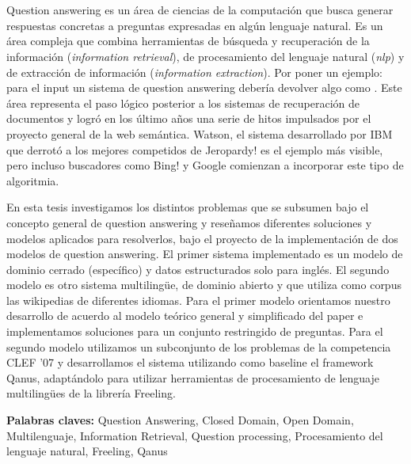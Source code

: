 \chapter*{\runtitulo}
Question answering es un área de ciencias de la computación que busca generar respuestas concretas a preguntas expresadas en algún lenguaje natural. Es un área compleja que combina herramientas de búsqueda y recuperación de la información (\textit{information retrieval}), de procesamiento del lenguaje natural (\textit{nlp}) y de extracción de información (\textit{information extraction}). Por poner un ejemplo: para el input \textit{} un sistema de question answering debería devolver algo como .
Este área representa el paso lógico posterior a los sistemas de recuperación de documentos y logró en los último años una serie de hitos impulsados por el proyecto general de la web semántica. Watson, el sistema desarrollado por IBM que derrotó a los mejores competidos de Jeropardy! es el ejemplo más visible, pero incluso buscadores como Bing! y Google comienzan a incorporar este tipo de algoritmia.

En esta tesis investigamos los distintos problemas que se subsumen bajo el concepto general de question answering y reseñamos diferentes soluciones y modelos aplicados para resolverlos, bajo el proyecto de la implementación de dos modelos de question answering. El primer sistema implementado es un modelo de dominio cerrado (específico) y datos estructurados solo para inglés. El segundo modelo es otro sistema multilingüe, de dominio abierto y que utiliza como corpus las wikipedias de diferentes idiomas. Para el primer modelo orientamos nuestro desarrollo de acuerdo al modelo teórico general y simplificado del paper \cite{QADB1} e implementamos soluciones para un conjunto restringido de preguntas.  Para el segundo modelo utilizamos  un subconjunto de los problemas de la competencia CLEF '07 y desarrollamos el sistema utilizando como baseline el framework Qanus, adaptándolo para utilizar herramientas de procesamiento de lenguaje multilingües de la librería Freeling.
\bigskip

\noindent\textbf{Palabras claves:} Question Answering, Closed Domain, Open Domain, Multilenguaje, Information Retrieval, Question processing, Procesamiento del lenguaje natural, Freeling, Qanus